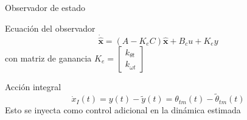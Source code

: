 \begin{frame}{Observador de estado}
  \begin{block}{Ecuación del observador}
    \[
    \dot{\hat{\mathbf{x}}} = (A - K_e C) \hat{\mathbf{x}} + B_c u + K_e y
    \]
    con matriz de ganancia $K_e = \begin{bmatrix} k_{\theta t} \\ k_{\omega t} \end{bmatrix}$
  \end{block}

  \vspace{0.1cm}
  \begin{block}{Acción integral}
    \[
    \dot{x}_I(t) = y(t) - \tilde{y}(t) = \theta_{tm}(t) - \tilde{\theta}_{tm}(t)
    \]
    Esto se inyecta como control adicional en la dinámica estimada
  \end{block}
\end{frame}

